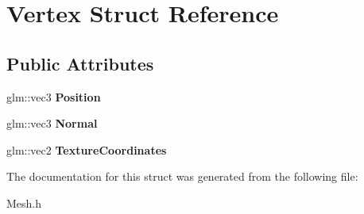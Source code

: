 \hypertarget{struct_vertex}{}\section{Vertex Struct Reference}
\label{struct_vertex}
\subsection*{Public Attributes}
\begin{DoxyCompactItemize}
\item 
\hypertarget{struct_vertex_abb3cfacd96b5955b0cec9359840ee49f}{}glm\+::vec3 {\bfseries Position}\label{struct_vertex_abb3cfacd96b5955b0cec9359840ee49f}

\item 
\hypertarget{struct_vertex_a9ab4dc431b41509f0b1bb1a4bf09d4e2}{}glm\+::vec3 {\bfseries Normal}\label{struct_vertex_a9ab4dc431b41509f0b1bb1a4bf09d4e2}

\item 
\hypertarget{struct_vertex_aacb5c10fd66d3c6b12771fa50b0ebf10}{}glm\+::vec2 {\bfseries Texture\+Coordinates}\label{struct_vertex_aacb5c10fd66d3c6b12771fa50b0ebf10}

\end{DoxyCompactItemize}


The documentation for this struct was generated from the following file\+:\begin{DoxyCompactItemize}
\item 
Mesh.\+h\end{DoxyCompactItemize}

